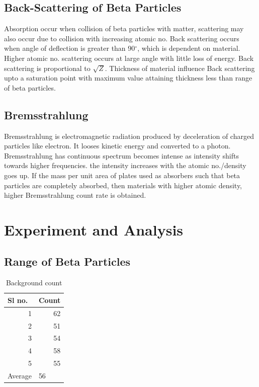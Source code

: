 \documentclass[a4paper, amsfonts, amssymb, amsmath, reprint, showkeys, nofootinbib, twoside]{revtex4-1}
\begin{document}
\subsection{Back-Scattering of Beta Particles}


Absorption occur when collision of beta particles with matter, scattering may also occur due to collision with increasing atomic no. Back scattering occurs when angle of deflection is greater than 90$^\circ$, which is dependent on material. Higher atomic no. scattering occurs at large angle with little loss of energy. Back scattering is proportional to $\sqrt{Z}$. Thickness of material influence Back scattering upto a saturation point with maximum value attaining thickness less than range of beta particles. 



\subsection{Bremsstrahlung}
Bremsstrahlung is electromagnetic radiation produced by deceleration of charged particles like electron. It looses kinetic energy and converted to a photon. Bremsstrahlung has continuous spectrum becomes intense as intensity shifts towards higher frequencies. the intensity increases with the atomic no./density goes up. If the mass per unit area of plates used as absorbers such that beta particles are completely absorbed, then materials with higher atomic density, higher Bremsstrahlung count rate is obtained.
\section{Experiment and Analysis}
\subsection{Range of Beta Particles }
\begin{table}[H]
	\centering
	\caption{Background count}
	\label{t1}
		\begin{tabular}{|r|r|}
			\hline
			\multicolumn{1}{|l|}{Sl no.}  & \multicolumn{1}{l|}{Count} \\ \hline
			1                             & 62                         \\ \hline
			2                             & 51                         \\ \hline
			3                             & 54                         \\ \hline
			4                             & 58                         \\ \hline
			5                             & 55                         \\ \hline
			\multicolumn{1}{|l|}{Average} & \multicolumn{1}{l|}{56}    \\ \hline
		\end{tabular}
\end{table}
\end{document}
